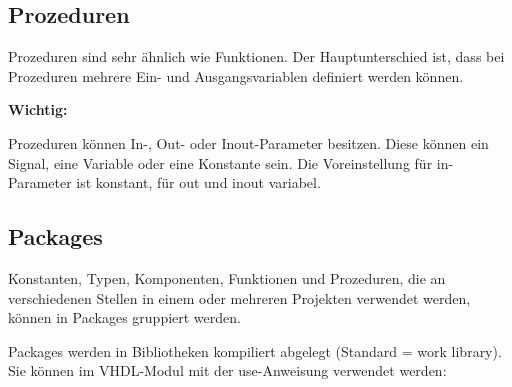 \subsection{Prozeduren}$~$ \\
Prozeduren sind sehr ähnlich wie Funktionen. Der Hauptunterschied ist, dass bei Prozeduren mehrere Ein- und Ausgangsvariablen definiert werden können.

\textbf{Wichtig: }
\begin{compactitem}
    \item Prozeduren können In-, Out- oder Inout-Parameter besitzen. Diese können ein Signal, eine Variable oder eine Konstante sein. Die Voreinstellung für in-Parameter ist konstant, für out und inout variabel.
\end{compactitem}

\subsection{Packages}$~$ \\
Konstanten, Typen, Komponenten, Funktionen und Prozeduren, die an verschiedenen Stellen in einem oder mehreren Projekten verwendet werden, können in Packages gruppiert werden.

Packages werden in Bibliotheken kompiliert abgelegt (Standard = work library). Sie können im VHDL-Modul mit der use-Anweisung verwendet werden:

